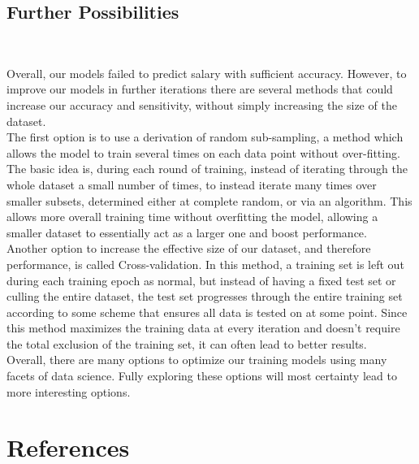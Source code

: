 \documentclass{article}
\begin{document}
	\subsection{Further Possibilities}~
	
	Overall, our models failed to predict salary with sufficient accuracy. However, to improve our models in further iterations there are several methods that could increase our accuracy and sensitivity, without simply increasing the size of the dataset.\\
	
	The first option is to use a derivation of random sub-sampling, a method which allows the model to train several times on each data point without over-fitting. The basic idea is, during each round of training, instead of iterating through the whole dataset a small number of times, to instead iterate many times over smaller subsets, determined either at complete random, or via an algorithm. This allows more overall training time without overfitting the model, allowing a smaller dataset to essentially act as a larger one and boost performance.\\
	
	Another option to increase the effective size of our dataset, and therefore performance, is called Cross-validation. In this method, a training set is left out during each training epoch as normal, but instead of having a fixed test set or culling the entire dataset, the test set progresses through the entire training set according to some scheme that ensures all data is tested on at some point. Since this method maximizes the training data at every iteration and doesn't require the total exclusion of the training set, it can often lead to better results.\\

	Overall, there are many options to optimize our training models using many facets of data science. Fully exploring these options will most certainty lead to more interesting options.

	\newpage
	\section{References}~
\end{document}
